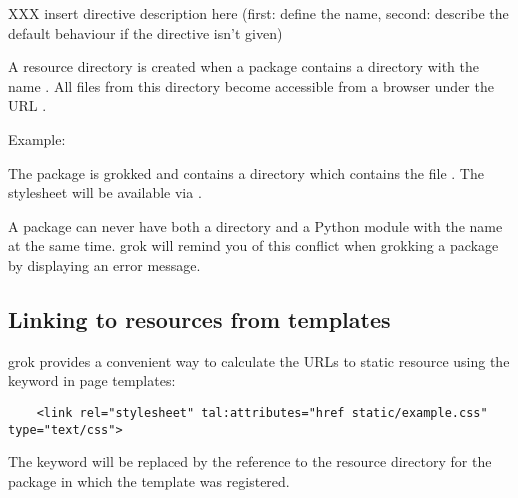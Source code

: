 XXX insert directive description here (first: define the name, second: describe
the default behaviour if the directive isn't given)

A resource directory is created when a package contains a directory
with the name .  All files from this directory become
accessible from a browser under the URL
.

\begin{bf}Example:\end{bf} The package  is grokked and contains a
directory  which contains the file . The
stylesheet will be available via
.

\begin{notice}A package can never have both a  directory
  and a Python module with the name  at the same
  time. grok will remind you of this conflict when grokking a package
  by displaying an error message.

\end{notice}

\subsection{Linking to resources from templates}

    grok provides a convenient way to calculate the URLs to static resource
    using the keyword  in page templates:

    \begin{verbatim}
    <link rel="stylesheet" tal:attributes="href static/example.css" type="text/css">
    \end{verbatim}

    The keyword  will be replaced by the reference to the
    resource directory for the package in which the template was registered.

